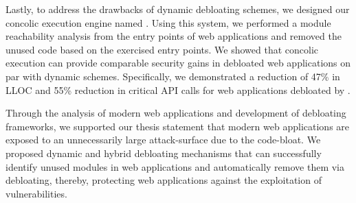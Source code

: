 Lastly, to address the drawbacks of dynamic debloating schemes, we designed our concolic execution engine named \animatedead{}. 
Using this system, we performed a module reachability analysis from the entry points of web applications and removed the unused code based on the exercised entry points. 
We showed that concolic execution can provide comparable security gains in debloated web applications on par with dynamic schemes. 
Specifically, we demonstrated a reduction of 47\% in LLOC and 55\% reduction in critical API calls for web applications debloated by \animatedead{}. 

Through the analysis of modern web applications and development of debloating frameworks, we supported our thesis statement that modern web applications are exposed to an unnecessarily large attack-surface due to the code-bloat. 
We proposed dynamic and hybrid debloating mechanisms that can successfully identify unused modules in web applications and automatically remove them via debloating, thereby, protecting web applications against the exploitation of vulnerabilities. 